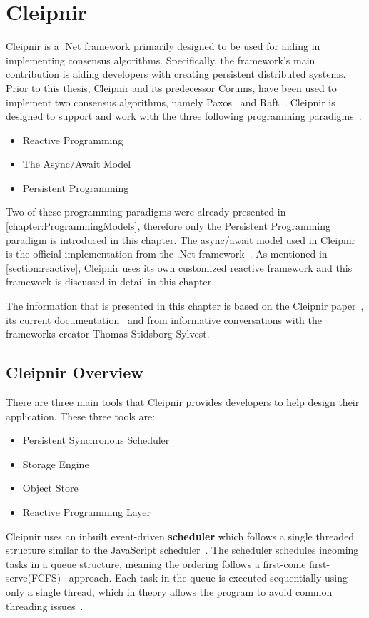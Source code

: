 \chapter{Cleipnir}
\label{chapter:Cleipnir}

Cleipnir is a .Net framework primarily designed to be used for aiding in implementing consensus algorithms. Specifically, the framework's main contribution is aiding developers with creating persistent distributed systems. Prior to this thesis, Cleipnir and its predecessor Corums, have been used to implement two consensus algorithms, namely Paxos~\cite[p.~32-38]{PAPER:EivindPaper} and Raft~\cite[p.~13-15]{PAPER:PaxosCleipnir}.
Cleipnir is designed to support and work with the three following programming paradigms~\cite[p.~5]{PAPER:PaxosCleipnir}:
\begin{itemize}
\item {Reactive Programming}
\item {The Async/Await Model}
\item {Persistent Programming}
\end{itemize}

Two of these programming paradigms were already presented in \autoref{chapter:ProgrammingModels}, therefore only the Persistent Programming paradigm is introduced in this chapter. The async/await model used in Cleipnir is the official implementation from the .Net framework~\cite{DOC:AsyncAwait}. As mentioned in \autoref{section:reactive}, Cleipnir uses its own customized reactive framework and this framework is discussed in detail in this chapter.

The information that is presented in this chapter is based on the Cleipnir paper~\cite{PAPER:PaxosCleipnir}, its current documentation~\cite{DOC:Cleipnir} and from informative conversations with the frameworks creator Thomas Stidsborg Sylvest.

\section{Cleipnir Overview}
\label{section:CleipnirOv}
There are three main tools that Cleipnir provides developers to help design their application.
These three tools are:
\begin{itemize}
	\item{Persistent Synchronous Scheduler}
	\item{Storage Engine}
	\item{Object Store}
	\item{Reactive Programming Layer}
\end{itemize}
Cleipnir uses an inbuilt event-driven \textbf{scheduler} which follows a single threaded structure similar to the JavaScript scheduler~\cites[p.~7]{PAPER:PaxosCleipnir}{WEB:CleipnirScheduler}. The scheduler schedules incoming tasks in a queue structure, meaning the ordering follows a first-come first-serve(FCFS)~\cite{WEB:FIFO} approach. Each task in the queue is executed sequentially using only a single thread, which in theory allows the program to avoid common threading issues~\cite[p.~7]{PAPER:PaxosCleipnir}. %

